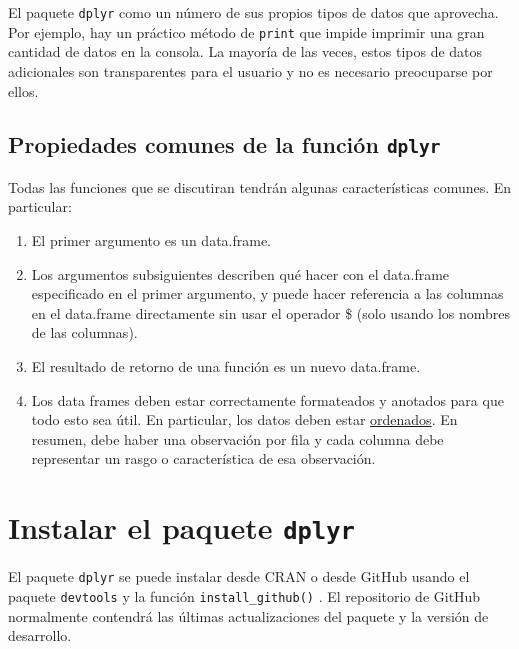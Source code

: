 \documentclass[
]{book}
\begin{document}
El paquete \texttt{dplyr} como un número de sus propios tipos de datos que aprovecha. Por ejemplo, hay un práctico método de \texttt{print} que impide imprimir una gran cantidad de datos en la consola. La mayoría de las veces, estos tipos de datos adicionales son transparentes para el usuario y no es necesario preocuparse por ellos.

\hypertarget{propiedades-comunes-de-la-funciuxf3n-dplyr}{%
\subsection{\texorpdfstring{Propiedades comunes de la función \texttt{dplyr}}{Propiedades comunes de la función dplyr}}\label{propiedades-comunes-de-la-funciuxf3n-dplyr}}

Todas las funciones que se discutiran tendrán algunas características comunes. En particular:

\begin{enumerate}
\def\labelenumi{\arabic{enumi}.}
\item
  El primer argumento es un data.frame.
\item
  Los argumentos subsiguientes describen qué hacer con el data.frame especificado en el primer argumento, y puede hacer referencia a las columnas en el data.frame directamente sin usar el operador \$ (solo usando los nombres de las columnas).
\item
  El resultado de retorno de una función es un nuevo data.frame.
\item
  Los data frames deben estar correctamente formateados y anotados para que todo esto sea útil. En particular, los datos deben estar \href{http://www.jstatsoft.org/v59/i10/paper}{ordenados}. En resumen, debe haber una observación por fila y cada columna debe representar un rasgo o característica de esa observación.
\end{enumerate}

\hypertarget{instalar-el-paquete-dplyr}{%
\section{\texorpdfstring{Instalar el paquete \texttt{dplyr}}{Instalar el paquete dplyr}}\label{instalar-el-paquete-dplyr}}

El paquete \texttt{dplyr} se puede instalar desde CRAN o desde GitHub usando el paquete \texttt{devtools} y la función \texttt{install\_github()} . El repositorio de GitHub normalmente contendrá las últimas actualizaciones del paquete y la versión de desarrollo.
\end{document}
